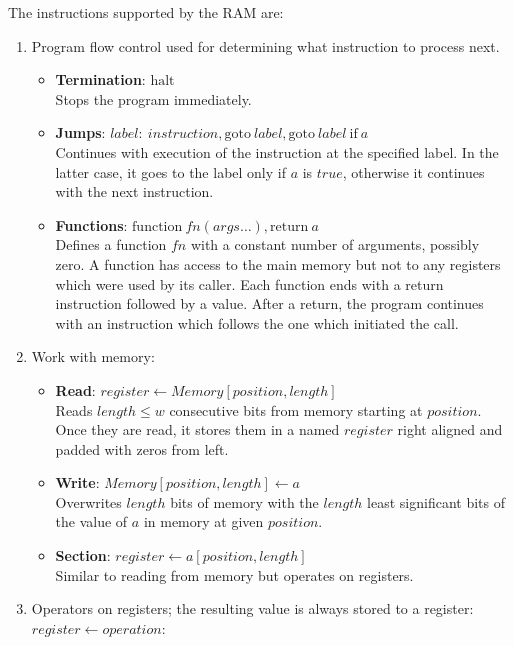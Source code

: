 The instructions supported by the RAM are:
\begin{enumerate}
	\item Program flow control used for determining what instruction to process next.
	\begin{itemize}
		\item \textbf{Termination}: $\textrm{halt}$ \\
		Stops the program immediately.
		\item \textbf{Jumps}: $label{:}\ instruction, \textrm{goto}\ label, \textrm{goto}\ label\ \textrm{if}\ a$ \\
		Continues with execution of the instruction at the specified label.
		In the latter case, it goes to the label only if $a$ is $true$, otherwise it continues with the next instruction.
		\item \textbf{Functions}: $\textrm{function}\ fn(args\ldots), \textrm{return}\ a$ \\
		Defines a function $fn$ with a constant number of arguments, possibly zero.
		A function has access to the main memory but not to any registers which were used by its caller.
		Each function ends with a return instruction followed by a value.
		After a return, the program continues with an instruction which follows the one which initiated the call.
	\end{itemize}
	\item Work with memory:
	\begin{itemize}
		\item \textbf{Read}: $register \gets Memory[position, length]$ \\ 
		Reads $length \le w$ consecutive bits from memory starting at $position$.
		Once they are read, it stores them in a named $register$ right aligned and padded with zeros from left.
		\item \textbf{Write}: $Memory[position, length] \gets a$ \\
		Overwrites $length$ bits of memory with the $length$ least significant bits of the value of $a$ in memory at given $position$.
		\item \textbf{Section}: $register \gets a[position, length]$ \\
		Similar to reading from memory but operates on registers.
	\end{itemize}
	\item Operators on registers; the resulting value is always stored to a register: $register \gets operation$:
	\begin{itemize}

\end{itemize}
\end{enumerate}
